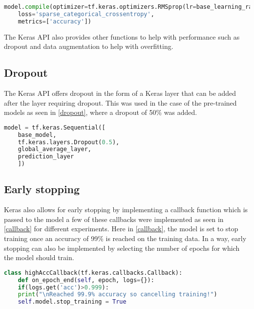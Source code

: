 \begin{lstlisting}[language=Python, caption=Compiling model with sparse categorical crossentropy loss , label=loss]
    model.compile(optimizer=tf.keras.optimizers.RMSprop(lr=base_learning_rate),
    loss='sparse_categorical_crossentropy',
    metrics=['accuracy'])
\end{lstlisting}


The Keras API also provides other functions to help with performance such as dropout and data augmentation to help with overfitting.

\subsection{Dropout}
The Keras API offers dropout in the form of a Keras layer that can be added after the layer requiring dropout. This was used in the case of the pre-trained models as seen in \ref{dropout}, where a dropout of 50\% was added.

\begin{lstlisting}[language=Python, caption=Application of dropout to pretrained models, label=dropout]
    model = tf.keras.Sequential([
    base_model,
    tf.keras.layers.Dropout(0.5),
    global_average_layer,
    prediction_layer
    ])
\end{lstlisting}

\subsection{Early stopping}

Keras also allows for early stopping by implementing a callback function which is passed to the model a few of these callbacks were implemented as seen in \ref{callback} for different experiments. Here in \ref{callback}, the model is set to stop training once an accuracy of 99\% is reached on the training data. In a way, early stopping can also be implemented by selecting the number of epochs for which the model should train. 

\begin{lstlisting}[language=Python, caption=Implementing early stopping at 99\% accurracy with keras call back, label=callback]
    class highAccCallback(tf.keras.callbacks.Callback):
    def on_epoch_end(self, epoch, logs={}):
    if(logs.get('acc')>0.999):
    print("\nReached 99.9% accuracy so cancelling training!")
    self.model.stop_training = True

\end{lstlisting}

